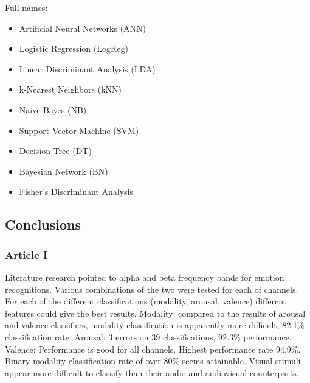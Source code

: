 \documentclass[10pt,journal,compsoc]{IEEEtran}
\begin{document}
Full names:
\begin{itemize}
\item{Artificial Neural Networks (ANN)}
\item{Logistic Regression (LogReg)}
\item{Linear Discriminant Analysis (LDA)}
\item{k-Nearest Neighbors (kNN)}
\item{Naive Bayes (NB)}
\item{Support Vector Machine (SVM)}
\item{Decision Tree (DT)}
\item{Bayesian Network (BN)}
\item{Fisher’s Discriminant Analysis}
\end{itemize}

\subsection{Conclusions}

\subsubsection*{Article I}
Literature research pointed to alpha and beta frequency bands for emotion recognitions. Various combinations of the two were tested for each of channels. For each of the different classifications (modality, arousal, valence) different features could give the best results. Modality: compared to the results of arousal and valence classifiers, modality classification is apparently more difficult, 82.1\% classification rate. Arousal: 3 errors on 39 classifications, 92.3\% performance. Valence: Performance is good for all channels. Highest performance rate 94.9\%. Binary modality classification rate of over 80\% seems attainable. Visual stimuli appear more difficult to classify than their audio and audiovisual counterparts.
\end{document}
